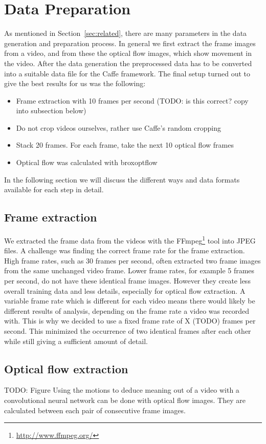 \section{Data Preparation}
\label{sec:data}

As mentioned in Section~\ref{sec:related}, there are many parameters in the data generation and preparation process.
In general we first extract the frame images from a video, and from these the optical flow images, which show movement in the video.
After the data generation the preprocessed data has to be converted into a suitable data file for the Caffe framework.
The final setup turned out to give the best results for us was the following:
\begin{itemize}
	\item Frame extraction with 10 frames per second (TODO: is this correct? copy into subsection below)
	\item Do not crop videos ourselves, rather use Caffe's random cropping
	\item Stack 20 frames. For each frame, take the next 10 optical flow frames
	\item Optical flow was calculated with broxoptflow \cite{brox2004high}
\end{itemize}
In the following section we will discuss the different ways and data formats available for each step in detail.

\subsection{Frame extraction}
We extracted the frame data from the videos with the FFmpeg\footnote{\url{http://www.ffmpeg.org/}} tool into JPEG files.
A challenge was finding the correct frame rate for the frame extraction.
High frame rates, such as 30 frames per second, often extracted two frame images from the same unchanged video frame.
Lower frame rates, for example 5 frames per second, do not have these identical frame images.
However they create less overall training data and less details, especially for optical flow extraction.
A variable frame rate which is different for each video means there would likely be different results of analysis, depending on the frame rate a video was recorded with.
This is why we decided to use a fixed frame rate of X (TODO) frames per second.
This minimized the occurrence of two identical frames after each other while still giving a sufficient amount of detail.

\subsection{Optical flow extraction}
TODO: Figure
Using the motions to deduce meaning out of a video with a convolutional neural network can be done with optical flow images.
They are calculated between each pair of consecutive frame images.

